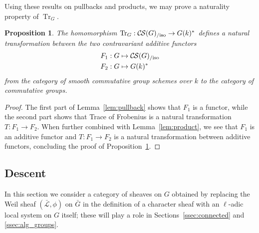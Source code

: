 \documentclass[10pt]{amsart}
\theoremstyle{plain}
\newtheorem{proposition}[theorem]{Proposition}
\theoremstyle{definition}
\newcommand{\Fq}{k}
\newcommand{\TrFrob}[1]{\operatorname{Tr}_{#1}}
\newcommand{\gcs}[1]{{\mathcal{\bar #1}}}
\newcommand{\CS}{{\mathcal{C\hskip-0.8pt S}}}
\newcommand{\CSiso}[1]{\CS(#1)_{/\text{iso}}}
\newcommand{\bG}{\bar{G}}
\begin{document}
Using these results on pullbacks and products, we may prove a naturality property of $\TrFrob{G}$.

\begin{proposition}\label{prop:functorialG}
The homomorphism $\TrFrob{G} : \CSiso{G} \to G(\Fq)^*$ defines a natural transformation
between the two contravariant additive functors
\begin{align*}
F_1 : G &\mapsto \CSiso{G} \\
F_2 : G &\mapsto G(\Fq)^*
\end{align*}
from the category of smooth commutative group schemes over $\Fq$ to the category of commutative groups.
\end{proposition}

\begin{proof}
The first part of Lemma~\ref{lem:pullback} shows that $F_1$ is a functor,
while the second part shows that Trace of Frobenius is a natural transformation
$T: F_1 \to F_2$. When further combined with Lemma~\ref{lem:product},
we see that $F_1$ is an additive functor and $T: F_1 \to F_2$ is a natural
transformation between additive functors,
concluding the proof of Proposition~\ref{prop:functorialG}.
\end{proof}


\subsection{Descent}\label{ssec:descentG}


In this section we consider a category of sheaves on $G$ obtained by replacing the Weil sheaf $(\gcs{L}, \phi)$
on $\bG$ in the definition of a character sheaf with an $\ell$-adic local system on $G$ itself;
these will play a role in Sections~\ref{ssec:connected} and \ref{ssec:alg_groups}.
\end{document}

